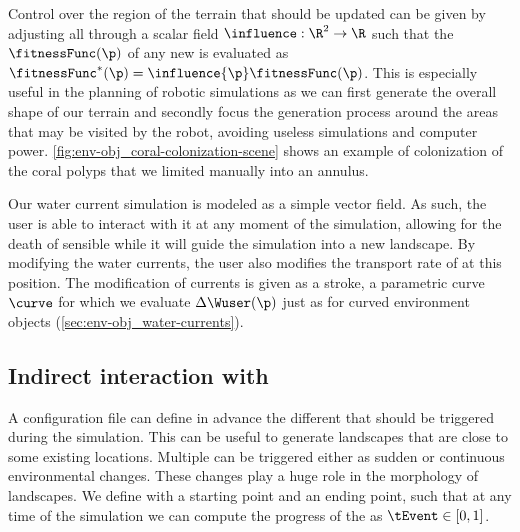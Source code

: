 Control over the region of the terrain that should be updated can be given by adjusting all  through a scalar field $\influence: \R^2 \to \R $ such that the  $\fitnessFunc(\p)$ of any new  is evaluated as $\fitnessFunc^*(\p) = \influence{\p} \fitnessFunc(\p)$. This is especially useful in the planning of robotic simulations as we can first generate the overall shape of our terrain and secondly focus the generation process around the areas that may be visited by the robot, avoiding useless simulations and computer power. 
\cref{fig:env-obj_coral-colonization-scene} shows an example of colonization of the coral polyps that we limited manually into an annulus.



Our water current simulation is modeled as a simple vector field. As such, the user is able to interact with it at any moment of the simulation, allowing for the death of sensible  while it will guide the simulation into a new landscape. By modifying the water currents, the user also modifies the transport rate of  at this position. The modification of currents is given as a stroke, a parametric curve $\curve$ for which we evaluate $\Delta \Wuser(\p)$ just as for curved environment objects (\cref{sec:env-obj_water-currents}).

\subsection{Indirect interaction with }
\label{sec:env-obj_events}
A configuration file can define in advance the different  that should be triggered during the simulation. This can be useful to generate landscapes that are close to some existing locations. 
Multiple  can be triggered either as sudden or continuous environmental changes. These changes play a huge role in the morphology of landscapes.
We define  with a starting point and an ending point, such that at any time of the simulation we can compute the progress of the  as $\tEvent \in [0, 1]$.

